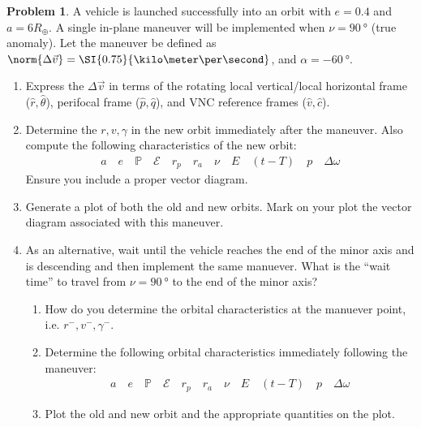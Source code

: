 \documentclass[10pt]{article}
\theoremstyle{definition}
\newtheorem{prob}{Problem}[section]
\newenvironment{subprob}%
{\renewcommand{\theenumi}{\alph{enumi}}\renewcommand{\labelenumi}{(\theenumi)}\begin{enumerate}}%
{\end{enumerate}}%
\begin{document}
\begin{prob}
    A vehicle is launched successfully into an orbit with \( e = 0.4\) and \( a = 6 R_{\oplus} \).
    A single in-plane maneuver will be implemented when \( \nu = \SI{90}{\degree}\) (true anomaly).
    Let the maneuver be defined as \( \norm{\Delta \vec v} = \SI{0.75}{\kilo\meter\per\second}\), and \( \alpha = -\SI{60}{\degree}\).

    \begin{subprob}
    \item Express the \( \Delta \vec v \) in terms of the rotating local vertical/local horizontal frame (\( \hat r, \hat \theta \)), perifocal frame (\( \hat p, \hat q \)), and VNC reference frames (\(\hat v, \hat c \)).
    \item Determine the \( r, v, \gamma \) in the new orbit immediately after the maneuver.
        Also compute the following characteristics of the new orbit:
        \begin{align*}
            a \quad e \quad \mathbb{P} \quad \mathcal{E} \quad r_p \quad r_a \quad \nu \quad E \quad (t - T) \quad p \quad \Delta \omega 
        \end{align*}
        Ensure you include a proper vector diagram.
    \item Generate a plot of both the old and new orbits.
        Mark on your plot the vector diagram associated with this maneuver.
    \item As an alternative, wait until the vehicle reaches the end of the minor axis and is descending and then implement the same manuever.
        What is the ``wait time'' to travel from \( \nu = \SI{90}{\degree} \) to the end of the minor axis?
        \begin{subprob}

            \item How do you determine the orbital characteristics at the manuever point, i.e. \( r^-, v^-, \gamma^- \).
            \item Determine the following orbital characteristics immediately following the maneuver:
                \begin{align*}
                    a \quad e \quad \mathbb{P} \quad \mathcal{E} \quad r_p \quad r_a \quad \nu \quad E \quad (t - T) \quad p \quad \Delta \omega 
                \end{align*}
            \item Plot the old and new orbit and the appropriate quantities on the plot.
        \end{subprob}
    \end{subprob}
\end{prob}
\end{document}

